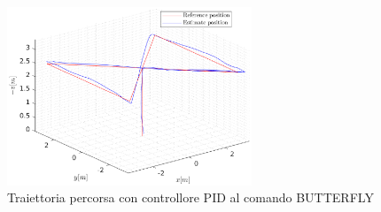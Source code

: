 \begin{figure}
	\centering
	\includegraphics[width=0.65\textwidth]{Simulazioni/Figure/PID/BUTTERFLY/Trajectory}
	\caption{Traiettoria percorsa con controllore PID al comando BUTTERFLY}
	\label{fig:BUTTERFLYtraPID}
\end{figure}

